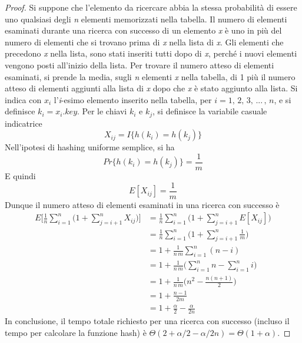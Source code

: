 \documentclass[10pt, a4paper]{report}
\begin{document}
\begin{proof}
Si suppone che l'elemento da ricercare abbia la stessa probabilità di essere uno qualsiasi degli \textit{n} elementi memorizzati nella tabella. Il numero di elementi esaminati durante una ricerca con successo di un elemento \textit{x} è uno in più del numero di elementi che si trovano prima di \textit{x} nella lista di \textit{x}. Gli elementi che precedono \textit{x} nella lista, sono stati inseriti tutti dopo di \textit{x}, perché i nuovi elementi vengono posti all'inizio della lista. Per trovare il numero atteso di elementi esaminati, si prende la media, sugli \textit{n} elementi \textit{x} nella tabella, di 1 più il numero atteso di elementi aggiunti alla lista di \textit{x} dopo che \textit{x} è stato aggiunto alla lista. Si indica con $x_i$ l'\textit{i}-esimo elemento inserito nella tabella, per $i = 1,\,2,\,3,\,...\,,\,n$, e si definisce $k_i = x_i.key$. Per le chiavi $k_i$ e $k_j$, si definisce la variabile casuale indicatrice
\begin{equation*}
X_{ij} = I\{h(k_i) = h(k_j)\}
\end{equation*}
Nell'ipotesi di hashing uniforme semplice, si ha
\begin{equation*}
Pr\{h(k_i) = h(k_j)\} = \frac{1}{m}
\end{equation*}
E quindi
\begin{equation*}
E[X_{ij}] = \frac{1}{m}
\end{equation*}
Dunque il numero atteso di elementi esaminati in una ricerca con successo è
\begin{align*}
E\Biggl[\frac{1}{n}\sum_{i=1}^{n}\Biggl(1 + \sum_{j=i+1}^{n}X_{ij}\Biggr)\Biggr] &= \frac{1}{n}\sum_{i=1}^{n}\Biggl(1 + \sum_{j=i+1}^{n}E[X_{ij}]\Biggr) \\
&= \frac{1}{n}\sum_{i=1}^{n}\Biggl(1 + \sum_{j=i+1}^{n}\frac{1}{m}\Biggr) \\
&= 1 + \frac{1}{n\,m}\sum_{i=1}^{n}(n - i) \\
&= 1 + \frac{1}{n\,m}\Biggl(\sum_{i=1}^{n}n - \sum_{i=1}^{n}i\Biggr) \\
&= 1 + \frac{1}{n\,m}\Biggl(n^2 - \frac{n(n+1)}{2}\Biggr) \\
&= 1 + \frac{n - 1}{2m} \\
&= 1 + \frac{\alpha}{2} - \frac{\alpha}{2n}
\end{align*}
In conclusione, il tempo totale richiesto per una ricerca con successo (incluso il tempo per calcolare la funzione hash) è $\Theta(2 + \alpha/2 - \alpha/2n) = \Theta(1 + \alpha)$.
\end{proof}
\end{document}
